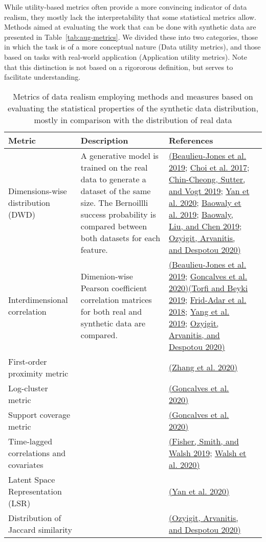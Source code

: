 \documentclass[10pt]{article}
\begin{document}
While utility-based metrics often provide a more convincing indicator of
data realism, they mostly lack the interpretability that some
statistical metrics allow. Methods aimed at evaluating the work that can
be done with synthetic data are presented in
Table~{\ref{tab:aug-metrics}}. We divided these into
two categories, those in which the task is of a more conceptual nature
(Data utility metrics), and those based on tasks with real-world
application (Application utility metrics). Note that this distinction is
not based on a rigororous definition, but serves to facilitate
understanding.
\begin{table}
    \caption{{Metrics of data realism employing methods and measures based on evaluating the statistical properties of the synthetic data distribution, mostly in comparison with the distribution of real data\label{tab:statmetrics}}} 
    
    \begin{tabular}{@{} p{} p{} p{} p{} @{}}\toprule
        Metric & Description & References\\ \midrule
        Dimensions-wise distribution (DWD) & A generative model is trained on the real data to generate a dataset of the same size. The Bernoillli success probability is compared between both datasets for each feature. & \hyperref[csl:16]{(Beaulieu-Jones et al. 2019}; \hyperref[csl:47]{Choi et al. 2017}; \hyperref[csl:38]{Chin-Cheong, Sutter, and Vogt 2019}; \hyperref[csl:46]{Yan et al. 2020}; \hyperref[csl:29]{Baowaly et al. 2019}; \hyperref[csl:28]{Baowaly, Liu, and Chen 2019}; \hyperref[csl:30]{Ozyigit, Arvanitis, and Despotou 2020)}\\
        Interdimensional correlation & Dimenion-wise Pearson coefficient correlation matrices for both real and synthetic data are compared. & \hyperref[csl:16]{(Beaulieu-Jones et al. 2019}; \hyperref[csl:18]{Goncalves et al. 2020)}\hyperref[csl:37]{(Torfi and Beyki 2019}; \hyperref[csl:53]{Frid-Adar et al. 2018}; \hyperref[csl:24]{Yang et al. 2019}; \hyperref[csl:30]{Ozyigit, Arvanitis, and Despotou 2020)}\\
        First-order proximity metric & {} & \hyperref[csl:32]{(Zhang et al. 2020)}\\
        Log-cluster metric & {} & \hyperref[csl:18]{(Goncalves et al. 2020)}\\
        Support coverage metric & {} & \hyperref[csl:18]{(Goncalves et al. 2020)}\\
        Time-lagged correlations and covariates & {} & \hyperref[csl:10]{(Fisher, Smith, and Walsh 2019}; \hyperref[csl:12]{Walsh et al. 2020)}\\
        Latent Space Representation (LSR) & {} & \hyperref[csl:46]{(Yan et al. 2020)}\\
        Distribution of Jaccard similarity & {} & \hyperref[csl:30]{(Ozyigit, Arvanitis, and Despotou 2020)}\\
        \bottomrule
    \end{tabular}
\end{table}
\end{document}
